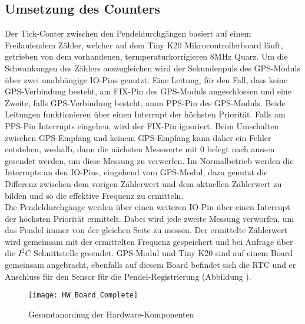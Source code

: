 \subsection{Umsetzung des Counters} %
Der Tick-Conter zwischen den Pendeldurchgängen basiert auf einem Freilaufendem Zähler, welcher auf dem Tiny K20 Mikrocontrollerboard läuft, getrieben von dem vorhandenen, termperaturkorrigieren 8MHz Quarz. Um die Schwankungen des Zählers auszugleichen wird der Sekundenpuls des GPS-Moduls über zwei unabhängige IO-Pins genutzt. Eine Leitung, für den Fall, dass keine GPS-Verbindung besteht, am FIX-Pin des GPS-Moduls angeschlossen und eine Zweite, falls GPS-Verbindung besteht, amm PPS-Pin des GPS-Moduls. Beide Leitungen funktionieren über einen Interrupt der höchsten Priorität. Falls am PPS-Pin Interrupts eingehen, wird der FIX-Pin ignoriert. Beim Umschalten zwischen GPS-Empfang und keinem GPS-Empfang kann daher ein Fehler entstehen, weshalb, dann die nächsten Messwerte mit 0 belegt nach aussen gesendet werden, um diese Messung zu verwerfen. Im Normalbetrieb werden die Interrupts an den IO-Pins, eingehend vom GPS-Modul, dazu genutzt die Differenz zwischen dem vorigen Zählerwert und dem aktuellen Zählerwert zu bilden und so die effektive Frequenz zu ermitteln.\\ 
Die Pendeldurchgänge werden über einen weiteren IO-Pin über einen Interrupt der höchsten Priorität ermittelt. Dabei wird jede zweite Messung verworfen, um das Pendel immer von der gleichen Seite zu messen. Der ermittelte Zählerwert wird gemeinsam mit der ermittelten Frequenz gespeichert und bei Anfrage über die $I^2C$ Schnittstelle gesendet.
GPS-Modul und Tiny K20 sind auf einem Board gemeinsam angebracht, ebenfalls auf diesem Board befindet sich die RTC und er Anschluss für den Sensor für die Pendel-Registrierung (Abbildung ).
	\begin{figure}[H]
		\centering
		\texttt{[image: HW\_Board\_Complete]}
		\caption{Gesamtanordnug der Hardware-Komponenten}
		\label{fig:info_SFH9201}
	\end{figure}